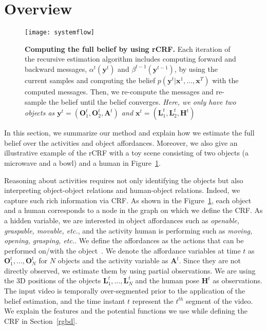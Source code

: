 \section{Overview}
\label{overview}
\begin{figure}[t]
  \texttt{[image: systemflow]}
  \caption{{\bf Computing the full belief by using rCRF.} Each iteration of the recursive estimation algorithm includes computing forward and backward messages, $\alpha^t(\mathbf{y}^t)$ and $\beta^{t-1}(\mathbf{y}^{t-1})$, by using the current samples and computing the belief $p(\mathbf{y}^t|\mathbf{x}^1,\ldots,\mathbf{x}^T)$ with the computed messages. Then, we re-compute the messages and re-sample the belief until the belief converges. \emph{Here, we only have two objects as  $\mathbf{y}^t=(\mathbf{O}^t_1,\mathbf{O}^t_2,\mathbf{A}^t)$ and $\mathbf{x}^t=(\mathbf{L}^t_1,\mathbf{L}^t_2,\mathbf{H}^t)$ }}
  \label{system}
\end{figure}
In this section, we summarize our method and explain how we estimate the full belief over the activities and object affordances. Moreover, we also give an illustrative example of the rCRF with a toy scene consisting of two objects (a microwave and a bowl) and a human in Figure~\ref{system}.

Reasoning about activities requires not only identifying the objects but also interpreting object-object relations and human-object relations. Indeed, we capture such rich information via CRF. As shown in the Figure~\ref{system}, each object and a human corresponds to a node in the graph on which we define the CRF. As a hidden variable, we are interested in object affordances such as \emph{openable, graspable, movable, etc.}, and the activity human is performing such as \emph{moving, opening, grasping, etc.}. We define the affordances as the actions that can be performed on/with the object~\cite{gibson1979}. We denote the affordance variables at time $t$ as $\mathbf{O}^t_1, \ldots, \mathbf{O}^t_N$ for $N$ objects and the activity variable as $\mathbf{A}^t$. Since they are not directly observed, we estimate them by using partial observations. We are using the 3D positions of the objects $\mathbf{L}^t_1,\ldots,\mathbf{L}^t_N$ and the human pose $\mathbf{H}^t$ as observations. %
The input video is temporally over-segmented prior to the application of the belief estimation, and the time instant $t$ represent the $t^{th}$ segment of the video. We explain the features and the potential functions we use while defining the CRF in Section~\ref{rgbd}.

